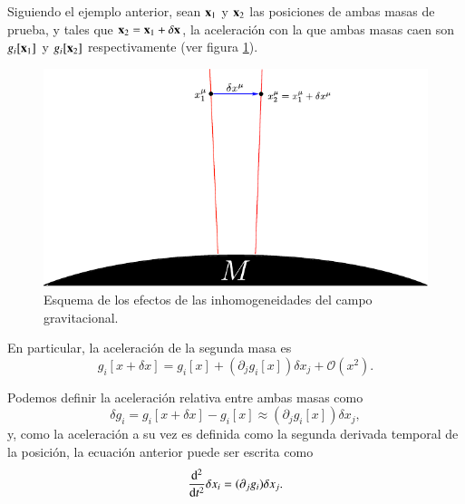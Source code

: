 Siguiendo el ejemplo anterior, sean $\vb{x}_1$ y $\vb{x}_2$ las posiciones de ambas masas de prueba, y tales que $\vb{x}_2 = \vb{x}_1 + \delta \vb{x}$, la aceleración con la que ambas masas caen son $g_i[\vb{x}_1]$ y $g_i[\vb{x}_2]$ respectivamente (ver figura \ref{fig:4}). 
\begin{figure}[h!]
\centering
\includegraphics[scale=1.2]{images/desvio.pdf}
\caption[Esquema de desvío]{Esquema de los efectos de las inhomogeneidades del campo gravitacional.}
\label{fig:4}
\end{figure}

En particular, la aceleración de la segunda masa es
\begin{equation}
g_i[x+\delta x] = g_i[x] + \left( \partial_j g_i[x] \right) \delta x_j + \mathcal{O}(x^2).
\end{equation}

Podemos definir la aceleración relativa entre ambas masas como
\begin{equation}
\delta g_i = g_i[x+\delta x] - g_i[x] \approx \left( \partial_j g_i[x] \right) \delta x_j,
\end{equation}
y, como la aceleración a su vez es definida como la segunda derivada temporal de la posición, la ecuación anterior puede ser escrita como
\begin{equation}
\label{eq:122}
\dv[2]{ }{t} \delta x_i = (\partial_j g_i) \delta x_j.
\end{equation}

